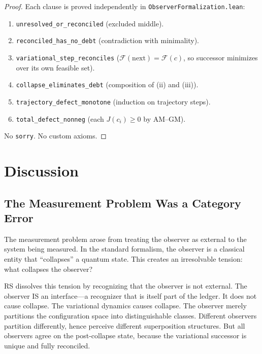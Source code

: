 \documentclass[11pt,a4paper]{article}
\theoremstyle{plain}
\theoremstyle{definition}
\theoremstyle{remark}
\newcommand{\Jcost}{J}
\newcommand{\F}{\mathcal{F}}
\begin{document}
\begin{proof}
Each clause is proved independently in \texttt{ObserverFormalization.lean}:
\begin{enumerate}[nosep,label=(\roman*)]
\item \texttt{unresolved\_or\_reconciled} (excluded middle).
\item \texttt{reconciled\_has\_no\_debt} (contradiction with minimality).
\item \texttt{variational\_step\_reconciles} ($\F(\text{next}) = \F(c)$, so successor minimizes over its own feasible set).
\item \texttt{collapse\_eliminates\_debt} (composition of (ii) and (iii)).
\item \texttt{trajectory\_defect\_monotone} (induction on trajectory steps).
\item \texttt{total\_defect\_nonneg} (each $\Jcost(c_i) \ge 0$ by AM--GM).
\end{enumerate}
No \texttt{sorry}.
No custom axioms.
\end{proof}

\section{Discussion}\label{sec:discussion}

\subsection{The Measurement Problem Was a Category Error}

The measurement problem arose from treating the observer as external to the system being measured.
In the standard formalism, the observer is a classical entity that ``collapses'' a quantum state.
This creates an irresolvable tension: what collapses the observer?

RS dissolves this tension by recognizing that the observer is not external.
The observer IS an interface---a recognizer that is itself part of the ledger.
It does not cause collapse.
The variational dynamics causes collapse.
The observer merely partitions the configuration space into distinguishable classes.
Different observers partition differently, hence perceive different superposition structures.
But all observers agree on the post-collapse state, because the variational successor is unique and fully reconciled.
\end{document}

